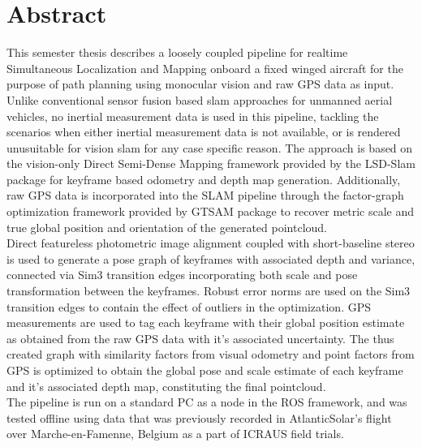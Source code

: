 \chapter*{Abstract}

This semester thesis describes a loosely coupled pipeline for realtime Simultaneous Localization and Mapping onboard a fixed winged aircraft for the purpose of path planning using monocular vision and raw GPS data as input. Unlike conventional sensor fusion based slam approaches for unmanned aerial vehicles, no inertial measurement data is used in this pipeline, tackling the scenarios when either inertial measurement data is not available, or is rendered unusuitable for vision slam for any case specific reason. The approach is based on the vision-only Direct Semi-Dense Mapping framework provided by the LSD-Slam package for keyframe based odometry and depth map generation. Additionally, raw GPS data is incorporated into the SLAM pipeline through the factor-graph optimization framework provided by GTSAM package to recover metric scale and true global position and orientation of the generated pointcloud. \\
Direct featureless photometric image alignment coupled with short-baseline stereo is used to generate a pose graph of keyframes with associated depth and variance, connected via Sim3 transition edges incorporating both scale and pose transformation between the keyframes. Robust error norms are used on the Sim3 transition edges to contain the effect of outliers in the optimization. GPS measurements are used to tag each keyframe with their global position estimate as obtained from the raw GPS data with it's associated uncertainty. The thus created graph with similarity factors from visual odometry and point factors from GPS is optimized to obtain the global pose and scale estimate of each keyframe and it's associated depth map, constituting the final pointcloud.\\
The pipeline is run on a standard PC as a node in the ROS framework, and was tested offline using data that was previously recorded in AtlanticSolar’s flight over Marche-en-Famenne, Belgium as a part of ICRAUS field trials.
